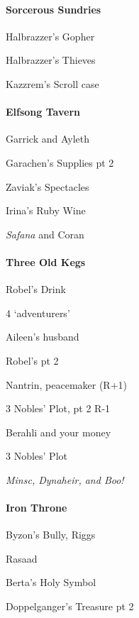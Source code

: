 \documentclass[10pt,a4,twoside]{book}
\begin{document}
\begin{multicols}{3}
\paragraph*{Sorcerous Sundries}
\begin{trivlist}
\item Halbrazzer's Gopher
\item Halbrazzer's Thieves %
\item Kazzrem's Scroll case
\end{trivlist}

\paragraph*{Elfsong Tavern}
\begin{trivlist}
\item Garrick and Ayleth
\item Garachen's Supplies pt 2 %
\item Zaviak's Spectacles
\item Irina's Ruby Wine %

\item \emph{Safana} and Coran
\end{trivlist}

\paragraph*{Three Old Kegs}
\begin{trivlist}
\item Robel's Drink
\item 4 `adventurers'
\item Aileen's husband
\item Robel's pt 2 %
\item Nantrin, peacemaker \textcolor{OliveGreen}{(R+1)}
\item 3 Nobles' Plot, pt 2 \textcolor{Mahogany}{R-1}
\item Berahli and your money %
\item 3 Nobles' Plot
\item \emph{Minsc, Dynaheir, and Boo!}
\end{trivlist}

\paragraph*{Iron Throne}
\begin{trivlist}
\item Byzon's Bully, Riggs
\item Rasaad
\item Berta's Holy Symbol
\item Doppelganger's Treasure pt 2 %
\end{trivlist}


\end{multicols}
\end{document}
